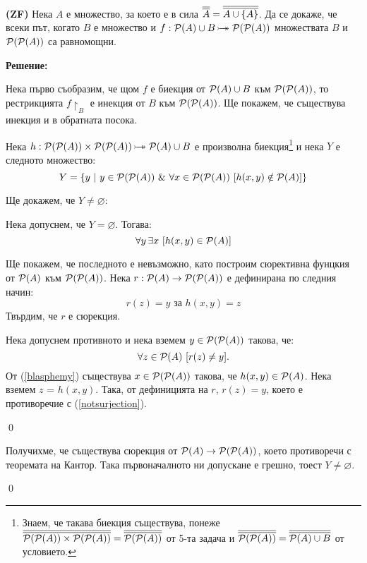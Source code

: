 \begin{problem}
\textbf{(ZF)}
Нека $A$ е множество, за което е в сила $\overline{\overline{A}} = \overline{\overline{A \cup \{A\}}}$.
Да се докаже, че всеки път, когато $B$ е множество и $f: \pow(A) \cup B \bijarrow \pow(\pow(A))$
множествата $B$ и $\mathcal{P}(\mathcal{P}(A))$ са равномощни.
\end{problem}

\textbf{Решение:}

\smallbreak
\quad
Нека първо съобразим, че щом $f$ е биекция от $\mathcal{P}(A) \cup B$ към $\mathcal{P}(\mathcal{P}(A))$,
то рестрикцията $f\restriction_B$ е инекция от $B$ към $\mathcal{P}(\mathcal{P}(A))$.
Ще покажем, че съществува инекция и в обратната посока.

\quad
Нека $h: \pow(\pow(A)) \times \pow(\pow(A)) \bijarrow \pow(A) \cup B$ е произволна биекция\footnote[2]{Знаем, че такава биекция съществува, понеже
$\overline{\overline{\mathcal{P}(\mathcal{P}(A)) \times \mathcal{P}(\mathcal{P}(A))}} = \overline{\overline{\mathcal{P}(\mathcal{P}(A))}}$ от 5-та задача и $\overline{\overline{\mathcal{P}(\mathcal{P}(A))}} = \overline{\overline{\mathcal{P}(A) \cup B}}$ от условието.}
и нека $Y$ е следното множество:
\[
Y = \{y\ |\ y \in \mathcal{P}(\mathcal{P}(A)) \ \&\  \forall x \in \mathcal{P}(\mathcal{P}(A))\ [h(x, y) \notin \mathcal{P}(A)]\}
\]

\quad
Ще докажем, че $Y \ne \varnothing$:
\begin{tcolorbox}[mybox={Доказателство:}]
\quad
Нека допуснем, че $Y = \varnothing$. Тогава:
\begin{equation}\label{blasphemy}
\forall y\, \exists x\ [h(x, y) \in \mathcal{P}(A)]
\end{equation}

\quad
Ще покажем, че последното е невъзможно, като построим сюрективна фунцкия от $\mathcal{P}(A)$ към $\mathcal{P}(\mathcal{P}(A))$.
Нека $r: \mathcal{P}(A) \to \mathcal{P}(\mathcal{P}(A))$ е дефинирана по следния начин:
\[
r(z) = y \text{ за } h(x, y) = z
\]
\quad
Твърдим, че $r$ е сюрекция.

\begin{tcolorbox}[mybox={Доказателство:}, colback=green!20, colframe=green!60]
\quad
Нека допуснем противното и нека вземем $y \in \mathcal{P}(\mathcal{P}(A))$ такова, че:
\begin{equation}\label{notsurjection}
\forall z \in \mathcal{P}(A)\ [r(z) \ne y].
\end{equation}
\quad
От (\ref{blasphemy}) съществува $x \in \mathcal{P}(\mathcal{P}(A))$ такова, че $h(x, y) \in \mathcal{P}(A)$.
Нека вземем $z$ = $h(x, y)$.
Така, от дефиницията на $r$, $r(z) = y$, което е противоречие с (\ref{notsurjection}).

\qed
\end{tcolorbox}

\quad
Получихме, че съществува сюрекция от $\mathcal{P}(A) \to \mathcal{P}(\mathcal{P}(A))$,
което противоречи с теоремата на Кантор.
Така първоначалното ни допускане е грешно, тоест $Y \ne \varnothing$.


\qed

\end{tcolorbox}

